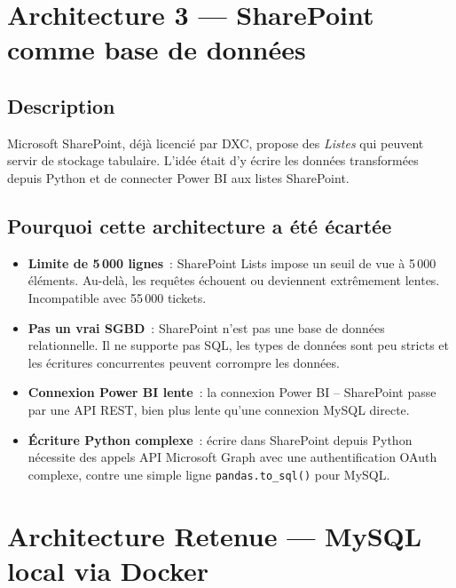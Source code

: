 \documentclass[12pt, a4paper]{article}
\begin{document}
\section{Architecture 3 — SharePoint comme base de données}

\subsection{Description}

Microsoft SharePoint, déjà licencié par DXC, propose des \emph{Listes} qui peuvent
servir de stockage tabulaire. L'idée était d'y écrire les données transformées depuis
Python et de connecter Power BI aux listes SharePoint.

\subsection{Pourquoi cette architecture a été écartée}

\begin{redbox}
\begin{itemize}[leftmargin=1.5em, itemsep=3pt]
  \item \textbf{Limite de 5\,000 lignes}~: SharePoint Lists impose un seuil de vue
        à 5\,000 éléments. Au-delà, les requêtes échouent ou deviennent extrêmement
        lentes. Incompatible avec 55\,000 tickets.
  \item \textbf{Pas un vrai SGBD}~: SharePoint n'est pas une base de données
        relationnelle. Il ne supporte pas SQL, les types de données sont peu stricts
        et les écritures concurrentes peuvent corrompre les données.
  \item \textbf{Connexion Power BI lente}~: la connexion Power BI -- SharePoint
        passe par une API REST, bien plus lente qu'une connexion MySQL directe.
  \item \textbf{Écriture Python complexe}~: écrire dans SharePoint depuis Python
        nécessite des appels API Microsoft Graph avec une authentification OAuth
        complexe, contre une simple ligne \texttt{pandas.to\_sql()} pour MySQL.
\end{itemize}
\end{redbox}

\section{Architecture Retenue — MySQL local via Docker}
\end{document}
